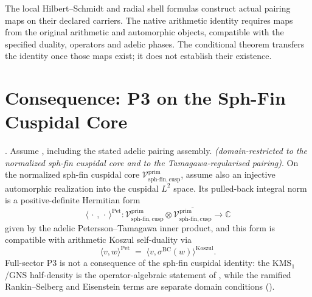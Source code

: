 \begin{remark}
\label{v4-arith:kp:rem:non-circular}
The local Hilbert--Schmidt and radial shell formulas construct actual
pairing maps on their declared carriers. The native arithmetic identity
requires maps from the original arithmetic and automorphic objects,
compatible with the specified duality, operators and adelic phases.
The conditional theorem transfers the identity once those maps exist;
it does not establish their existence.
\end{remark}

\section{Consequence: P3 on the Sph-Fin Cuspidal Core}
\label{v4-arith:kp:P3-unconditional}

\begin{corollary}
\label{v4-arith:kp:cor:P3-unconditional}
\ClaimStatusProvedHereConditional. Assume , including the stated adelic pairing assembly.  \emph{(domain-restricted to the normalized
sph-fin cuspidal core and to the Tamagawa-regularised pairing)}. On the normalized sph-fin cuspidal core
\(\mathcal{V}^{\mathrm{prim}}_{\mathrm{sph\text{-}fin,cusp}}\),
assume also an injective automorphic realization into the cuspidal
\(L^2\) space. Its pulled-back integral norm is a positive-definite Hermitian form
\begin{equation}
\label{v4-arith:kp:eq:Pet-form}
\langle\,\cdot\,,\,\cdot\,\rangle^{\mathrm{Pet}}\colon\mathcal{V}^{\mathrm{prim}}_{\mathrm{sph\text{-}fin,cusp}}\otimes\overline{\mathcal{V}^{\mathrm{prim}}_{\mathrm{sph\text{-}fin,cusp}}}\to\mathbb{C}
\end{equation}
given by the adelic Petersson--Tamagawa inner product, and this
form is compatible with arithmetic Koszul self-duality via
\begin{equation}
\label{v4-arith:kp:eq:Pet-Koszul-compat}
\langle v,w\rangle^{\mathrm{Pet}}
\;=\;\langle v,\sigma^{\mathrm{BC}}(w)\rangle^{\mathrm{Koszul}}.
\end{equation}
Full-sector P3 is not a consequence of the sph-fin cuspidal identity:
the KMS\(_{1}\)/GNS half-density is the operator-algebraic statement
of , while the
ramified Rankin--Selberg and Eisenstein terms are separate domain
conditions ().
\end{corollary}

